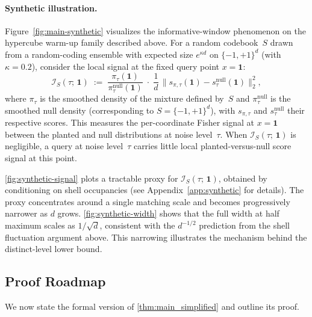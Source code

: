 \documentclass[11pt,letterpaper]{article}
\newcommand{\1}{\mathbbm{1}}
\begin{document}
\paragraph{Synthetic illustration.}
Figure~\ref{fig:main-synthetic} visualizes the informative-window
phenomenon on the hypercube warm-up family described above.
For a random codebook~$S$ drawn from a random-coding ensemble with
expected size $e^{\kappa d}$ on $\{-1,+1\}^d$ (with $\kappa=0.2$),
consider the local signal at the fixed query
point $x = \mathbf{1}$:
\[
\mathcal{I}_{S}(\tau;\,\mathbf{1})
\;:=\;
\frac{\pi_\tau(\mathbf{1})}{\pi^{\mathrm{null}}_\tau(\mathbf{1})}
\;\cdot\;
\frac{1}{d}\,
\bigl\|s_{\pi,\tau}(\mathbf{1})-s^{\mathrm{null}}_{\tau}(\mathbf{1})
\bigr\|_2^2,
\]
where $\pi_\tau$ is the smoothed density of the mixture defined
by~$S$ and $\pi^{\mathrm{null}}_\tau$ is the smoothed null density
(corresponding to $S = \{-1,+1\}^d$), with $s_{\pi,\tau}$ and
$s^{\mathrm{null}}_\tau$ their respective scores.
This measures the per-coordinate Fisher signal at $x=\mathbf{1}$
between the planted and null distributions at noise level~$\tau$.
When $\mathcal{I}_{S}(\tau;\,\mathbf{1})$ is negligible, a query
at noise level~$\tau$ carries little local planted-versus-null score
signal at this point.

\cref{fig:synthetic-signal} plots a tractable proxy for
$\mathcal{I}_{S}(\tau;\,\mathbf{1})$, obtained by conditioning on
shell occupancies
(see Appendix~\ref{app:synthetic} for details).
The proxy concentrates around a single matching scale and becomes
progressively narrower as $d$ grows.
\cref{fig:synthetic-width} shows that the full width at half
maximum scales as $1/\sqrt{d}$, consistent with the $d^{-1/2}$
prediction from the shell fluctuation argument above.
This narrowing illustrates the mechanism behind the distinct-level
lower bound.

\subsection{Proof Roadmap}
\label{sec:roadmap}

We now state the formal version of \cref{thm:main_simplified} and outline
its proof.
\end{document}

